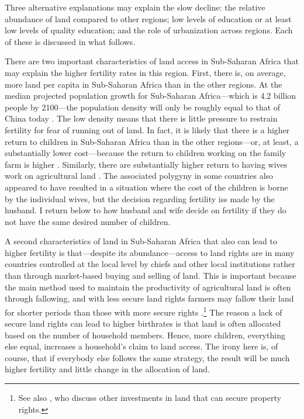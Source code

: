 Three alternative explanations may explain the slow decline: the relative abundance of land compared to other regions; low levels of education or at least low levels of quality education; and the role of urbanization across regions. Each of these is discussed in what follows.

There are two important characteristics of land access in Sub-Saharan Africa that may explain the higher fertility rates in this region. First, there is, on average, more land per capita in Sub-Saharan Africa than in the other regions. At the median projected population growth for Sub-Saharan Africa---which is 4.2 billion people by 2100---the population density will only be roughly equal to that of China today \citep[p 235]{Gerland2014}. The low density means that there is little pressure to restrain fertility for fear of running out of land. In fact, it is likely that there is a higher return to children in Sub-Saharan Africa than in the other regions---or, at least, a substantially lower cost---because the return to children working on the family farm is higher \citep{Caldwell1992,Bongaarts2013a}. Similarly, there are substantially higher return to having wives work on agricultural land \citep{jacoby95,Matz2016}. The associated polygyny in some countries also appeared to have resulted in a situation where the cost of the children is borne by the individual wives, but the decision regarding fertility iss made by the husband. I return below to how husband and wife decide on fertility if they do not have the same desired number of children.

A second characteristics of land in Sub-Saharan Africa that also can lead to higher fertility is that---despite its abundance---access to land rights are in many countries controlled at the local level by chiefs and other local institutions rather than through market-based buying and selling of land. This is important because the main method used to maintain the productivity of agricultural land is often through fallowing, and with less secure land rights farmers may fallow their land for shorter periods than those with more secure rights \citep{Goldstein2008}.\footnote{See also \citet{besley95c}, who discuss other investments in land that can secure property rights.} The reason a lack of secure land rights can lead to higher birthrates is that land is often allocated based on the number of household members. Hence, more children, everything else equal, increases a household's claim to land access. The irony here is, of course, that if everybody else follows the same strategy, the result will be much higher fertility and little change in the allocation of land.

